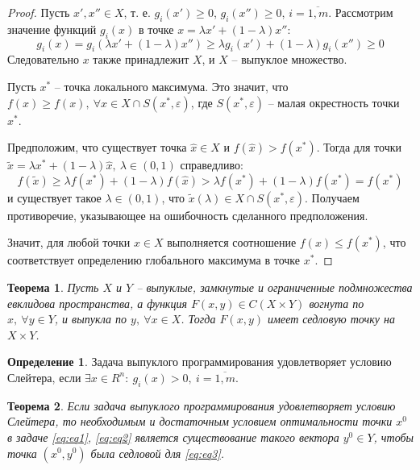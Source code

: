 \documentclass[12pt,a4paper,titlepage,oneside]{book}
\theoremstyle{definition}
\newtheorem{definition}{Определение}[chapter]
\theoremstyle{plain}
\newtheorem{theorem}{Теорема}[chapter]
\theoremstyle{remark}
\theoremstyle{remark}
\theoremstyle{plain}
\theoremstyle{plain}
\begin{document}
\begin{proof}
Пусть $x',x'' \in X$, т. е. $g_i(x') \geqslant 0$, $g_i(x'') \geqslant 0$, $i = \overline{1,m}$. Рассмотрим значение функций $g_i(x)$ в точке $x = \lambda x' + (1-\lambda) x''$:
$$g_i(x) = g_i(\lambda x'  + (1-\lambda) x'') \geqslant \lambda g_i(x') + (1-\lambda) g_i(x'') \geqslant 0$$
Следовательно $x$ также принадлежит $X$, и $X$ -- выпуклое множество.

Пусть $x^*$ -- точка локального максимума. Это значит, что $f(x) \geqslant f(x),~ \forall x \in X \cap S(x^*,\varepsilon)$, где $S(x^*,\varepsilon)$ -- малая окрестность точки $x^*$.

Предположим, что существует точка $\hat{x} \in X$ и $f(\hat{x})>f(x^*)$. Тогда для точки $\tilde{x} = \lambda x^* + (1-\lambda) \hat{x},~\lambda \in (0,1)$ справедливо:
$$f(\tilde{x}) \geqslant \lambda f(x^*)+ (1-\lambda) f(\hat{x}) > \lambda f(x^*) + (1-\lambda)f(x^*) = f(x^*)$$
и существует такое $\lambda \in (0,1)$, что $\tilde{x}(\lambda) \in X \cap S(x^*,\varepsilon)$. Получаем противоречие, указывающее на ошибочность сделанного предположения. 

Значит, для любой точки $x \in X$ выполняется соотношение $f(x) \leqslant f(x^*)$, что соответствует определению глобального максимума в точке $x^*$. 
\end{proof}

\begin{theorem}
Пусть $X$ и $Y$ -- выпуклые, замкнутые и ограниченные подмножества евклидова пространства, а функция $F(x,y) \in C(X \times Y)$ вогнута по $x,~\forall y \in Y$, и выпукла по $y,~\forall x \in X$. Тогда $F(x,y)$ имеет седловую точку на $X \times Y$. 
\end{theorem}

\begin{definition}
Задача выпуклого программирования удовлетворяет условию Слейтера, если $\exists x \in \textit{R}^n:~g_i(x)>0,~i=\overline{1,m}$.
\end{definition}

\begin{theorem}
Если задача выпуклого программирования удовлетворяет условию Слейтера, то необходимым и достаточным условием оптимальности точки $x^0$ в задаче \eqref{eq:eq1}, \eqref{eq:eq2} является существование такого вектора $y^0 \in Y$, чтобы точка $(x^0,y^0)$ была седловой для \eqref{eq:eq3}.
\end{theorem}
\end{document}
